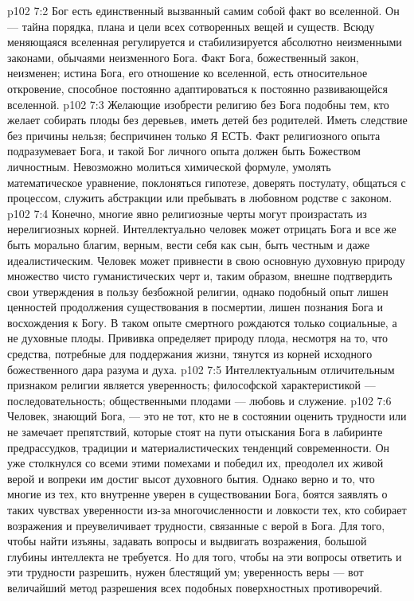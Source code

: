 \vs p102 7:2 Бог есть единственный вызванный самим собой факт во вселенной. Он --- тайна порядка, плана и цели всех сотворенных вещей и существ. Всюду меняющаяся вселенная регулируется и стабилизируется абсолютно неизменными законами, обычаями неизменного Бога. Факт Бога, божественный закон, неизменен; истина Бога, его отношение ко вселенной, есть относительное откровение, способное постоянно адаптироваться к постоянно развивающейся вселенной.
\vs p102 7:3 \pc Желающие изобрести религию без Бога подобны тем, кто желает собирать плоды без деревьев, иметь детей без родителей. Иметь следствие без причины нельзя; беспричинен только Я ЕСТЬ. Факт религиозного опыта подразумевает Бога, и такой Бог личного опыта должен быть Божеством личностным. Невозможно молиться химической формуле, умолять математическое уравнение, поклоняться гипотезе, доверять постулату, общаться с процессом, служить абстракции или пребывать в любовном родстве с законом.
\vs p102 7:4 Конечно, многие явно религиозные черты могут произрастать из нерелигиозных корней. Интеллектуально человек может отрицать Бога и все же быть морально благим, верным, вести себя как сын, быть честным и даже идеалистическим. Человек может привнести в свою основную духовную природу множество чисто гуманистических черт и, таким образом, внешне подтвердить свои утверждения в пользу безбожной религии, однако подобный опыт лишен ценностей продолжения существования в посмертии, лишен познания Бога и восхождения к Богу. В таком опыте смертного рождаются только социальные, а не духовные плоды. Прививка определяет природу плода, несмотря на то, что средства, потребные для поддержания жизни, тянутся из корней исходного божественного дара разума и духа.
\vs p102 7:5 Интеллектуальным отличительным признаком религии является уверенность; философской характеристикой --- последовательность; общественными плодами --- любовь и служение.
\vs p102 7:6 \pc Человек, знающий Бога, --- это не тот, кто не в состоянии оценить трудности или не замечает препятствий, которые стоят на пути отыскания Бога в лабиринте предрассудков, традиции и материалистических тенденций современности. Он уже столкнулся со всеми этими помехами и победил их, преодолел их живой верой и вопреки им достиг высот духовного бытия. Однако верно и то, что многие из тех, кто внутренне уверен в существовании Бога, боятся заявлять о таких чувствах уверенности из\hyp{}за многочисленности и ловкости тех, кто собирает возражения и преувеличивает трудности, связанные с верой в Бога. Для того, чтобы найти изъяны, задавать вопросы и выдвигать возражения, большой глубины интеллекта не требуется. Но для того, чтобы на эти вопросы ответить и эти трудности разрешить, нужен блестящий ум; уверенность веры --- вот величайший метод разрешения всех подобных поверхностных противоречий.
